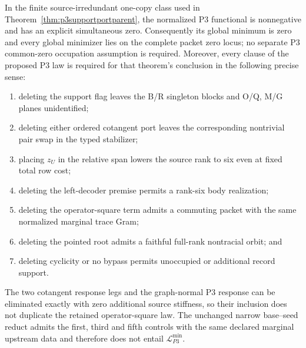 \begin{proposition}
\label{prop:p3minimalparentcertificate}
In the finite source-irredundant one-copy class used in
Theorem~\ref{thm:p3supportportparent}, the normalized P3 functional is
nonnegative and has an explicit simultaneous zero.  Consequently its global
minimum is zero and every global minimizer
lies on the complete packet zero locus; no separate P3 common-zero occupation
assumption is required.  Moreover, every clause of the proposed P3 law is
required for that theorem's conclusion in the following precise sense:
\begin{enumerate}[label=(\roman*),nosep]
\item deleting the support flag leaves the B/R singleton blocks and O/Q,
  M/G planes unidentified;
\item deleting either ordered cotangent port leaves the corresponding
  nontrivial pair swap in the typed stabilizer;
\item placing $z_U$ in the relative span lowers the source rank to six even
  at fixed total row cost;
\item deleting the left-decoder premise permits a rank-six body realization;
\item deleting the operator-square term admits a commuting packet with the
  same normalized marginal trace Gram;
\item deleting the pointed root admits a faithful full-rank nontracial orbit;
  and
\item deleting cyclicity or no bypass permits unoccupied or additional record
  support.
\end{enumerate}
The two cotangent response legs and the graph-normal P3 response can be
eliminated exactly with zero additional source stiffness, so their inclusion
does not duplicate the retained operator-square law.  The unchanged narrow
base--seed reduct admits the first, third and fifth controls with the same
declared marginal upstream data and therefore does not entail
$\mathcal L_{P3}^{\min}$.
\end{proposition}

